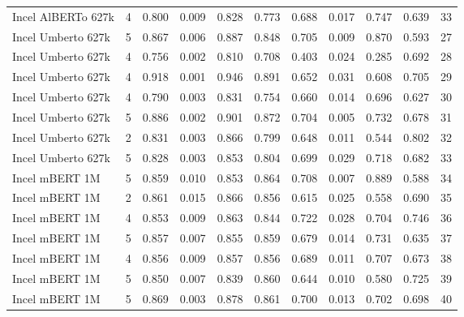 \begin{tabular}{lrrrrrrrrrr}
Incel AlBERTo 627k &      4 &   0.800 &          0.009 &    0.828 &     0.773 &    0.688 &           0.017 &     0.747 &      0.639 &  33 \\
Incel Umberto 627k &      5 &   0.867 &          0.006 &    0.887 &     0.848 &    0.705 &           0.009 &     0.870 &      0.593 &  27 \\
Incel Umberto 627k &      4 &   0.756 &          0.002 &    0.810 &     0.708 &    0.403 &           0.024 &     0.285 &      0.692 &  28 \\
Incel Umberto 627k &      4 &   0.918 &          0.001 &    0.946 &     0.891 &    0.652 &           0.031 &     0.608 &      0.705 &  29 \\
Incel Umberto 627k &      4 &   0.790 &          0.003 &    0.831 &     0.754 &    0.660 &           0.014 &     0.696 &      0.627 &  30 \\
Incel Umberto 627k &      5 &   0.886 &          0.002 &    0.901 &     0.872 &    0.704 &           0.005 &     0.732 &      0.678 &  31 \\
Incel Umberto 627k &      2 &   0.831 &          0.003 &    0.866 &     0.799 &    0.648 &           0.011 &     0.544 &      0.802 &  32 \\
Incel Umberto 627k &      5 &   0.828 &          0.003 &    0.853 &     0.804 &    0.699 &           0.029 &     0.718 &      0.682 &  33 \\
    Incel mBERT 1M &      5 &   0.859 &          0.010 &    0.853 &     0.864 &    0.708 &           0.007 &     0.889 &      0.588 &  34 \\
    Incel mBERT 1M &      2 &   0.861 &          0.015 &    0.866 &     0.856 &    0.615 &           0.025 &     0.558 &      0.690 &  35 \\
    Incel mBERT 1M &      4 &   0.853 &          0.009 &    0.863 &     0.844 &    0.722 &           0.028 &     0.704 &      0.746 &  36 \\
    Incel mBERT 1M &      5 &   0.857 &          0.007 &    0.855 &     0.859 &    0.679 &           0.014 &     0.731 &      0.635 &  37 \\
    Incel mBERT 1M &      4 &   0.856 &          0.009 &    0.857 &     0.856 &    0.689 &           0.011 &     0.707 &      0.673 &  38 \\
    Incel mBERT 1M &      5 &   0.850 &          0.007 &    0.839 &     0.860 &    0.644 &           0.010 &     0.580 &      0.725 &  39 \\
    Incel mBERT 1M &      5 &   0.869 &          0.003 &    0.878 &     0.861 &    0.700 &           0.013 &     0.702 &      0.698 &  40 \\

\end{tabular}

